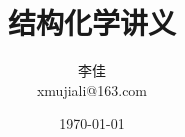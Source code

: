 \documentclass{ctexrep}[12pt,a4paper,openany]
\begin{document}
\title{\Huge 结构化学讲义}
\author{李佳\\xmujiali@163.com}
\date{\today}
\maketitle
\tableofcontents




%
%
%
\end{document}
